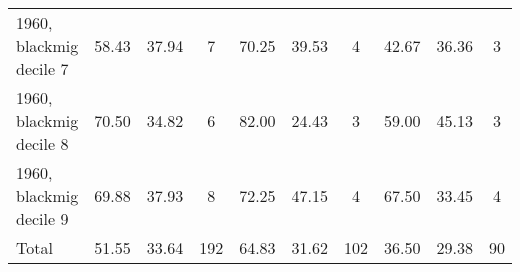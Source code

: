 \begin{table}[htbp]
\begin{tabular}{l*{3}{ccc}}
1960, blackmig decile 7&       58.43&       37.94&           7&       70.25&       39.53&           4&       42.67&       36.36&           3\\
1960, blackmig decile 8&       70.50&       34.82&           6&       82.00&       24.43&           3&       59.00&       45.13&           3\\
1960, blackmig decile 9&       69.88&       37.93&           8&       72.25&       47.15&           4&       67.50&       33.45&           4\\
Total               &       51.55&       33.64&         192&       64.83&       31.62&         102&       36.50&       29.38&          90\\
\bottomrule
\end{tabular}
\end{table}

